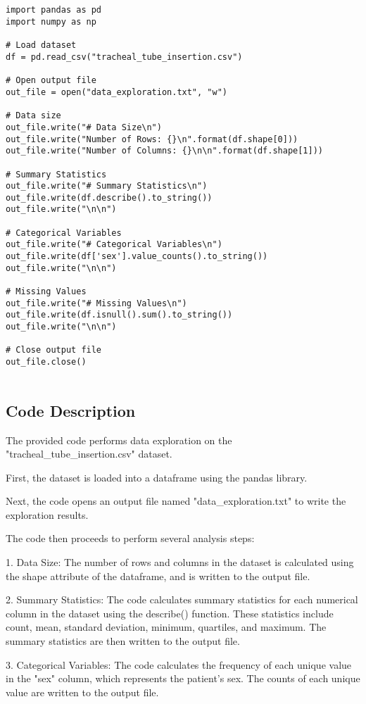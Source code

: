 \documentclass[11pt]{article}
\begin{document}
\begin{verbatim}


import pandas as pd
import numpy as np

# Load dataset
df = pd.read_csv("tracheal_tube_insertion.csv")

# Open output file
out_file = open("data_exploration.txt", "w")

# Data size
out_file.write("# Data Size\n")
out_file.write("Number of Rows: {}\n".format(df.shape[0]))
out_file.write("Number of Columns: {}\n\n".format(df.shape[1]))

# Summary Statistics
out_file.write("# Summary Statistics\n")
out_file.write(df.describe().to_string())
out_file.write("\n\n")

# Categorical Variables
out_file.write("# Categorical Variables\n")
out_file.write(df['sex'].value_counts().to_string())
out_file.write("\n\n")

# Missing Values
out_file.write("# Missing Values\n")
out_file.write(df.isnull().sum().to_string())
out_file.write("\n\n")

# Close output file
out_file.close()


\end{verbatim}

\subsection{Code Description}

The provided code performs data exploration on the "tracheal\_tube\_insertion.csv" dataset. 

First, the dataset is loaded into a dataframe using the pandas library. 

Next, the code opens an output file named "data\_exploration.txt" to write the exploration results.

The code then proceeds to perform several analysis steps:

1. Data Size:
   The number of rows and columns in the dataset is calculated using the shape attribute of the dataframe, and is written to the output file.

2. Summary Statistics:
   The code calculates summary statistics for each numerical column in the dataset using the describe() function. These statistics include count, mean, standard deviation, minimum, quartiles, and maximum. The summary statistics are then written to the output file.

3. Categorical Variables:
   The code calculates the frequency of each unique value in the "sex" column, which represents the patient's sex. The counts of each unique value are written to the output file.
\end{document}
